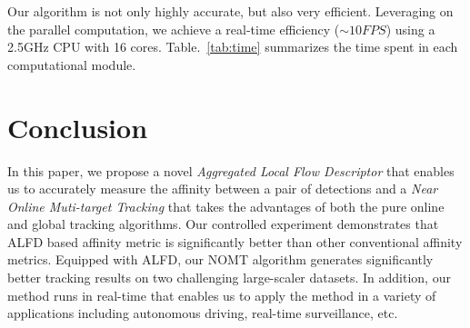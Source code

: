 \documentclass[10pt,twocolumn,letterpaper]{article}
\begin{document}
Our algorithm is not only highly accurate, but also very efficient. Leveraging on the parallel computation, we achieve a real-time efficiency ($\sim 10 FPS$) using a 2.5GHz CPU with 16 cores. Table.~\ref{tab:time} summarizes the time spent in each computational module. 

\section{Conclusion}
\label{sec:conc}
In this paper, we propose a novel \emph{Aggregated Local Flow Descriptor} that enables us to accurately measure the affinity between a pair of detections and a \emph{Near Online Muti-target Tracking} that takes the advantages of both the pure online and global tracking algorithms. Our controlled experiment demonstrates that ALFD based affinity metric is significantly better than other conventional affinity metrics. Equipped with ALFD, our NOMT algorithm generates significantly better tracking results on two challenging large-scaler datasets. In addition, our method runs in real-time that enables us to apply the method in a variety of applications including autonomous driving, real-time surveillance, etc.


{\small


}
\end{document}
